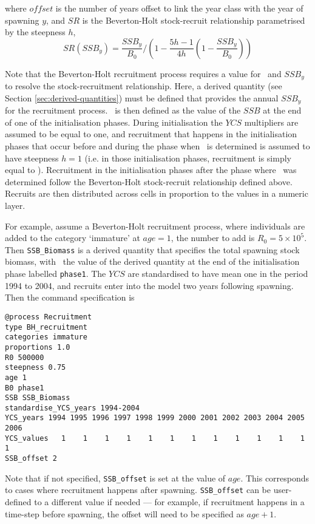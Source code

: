 where $offset$ is the number of years offset to link the year class with the year of spawning $y$, and $SR$ is the Beverton-Holt stock-recruit relationship parametrised by the steepness $h$,
\begin{equation}
SR(SSB_y) = \frac{SSB_y}{B_0} / \left( 1-\frac{5h-1}{4h} \left( 1-\frac{SSB_y}{B_0} \right) \right)
\end{equation}

Note that the Beverton-Holt recruitment process requires a value for \Bzero\ and $SSB_y$ to resolve the stock-recruitment relationship. Here, a derived quantity (see Section \ref{sec:derived-quantities}) must be defined that provides the annual $SSB_y$ for the recruitment process. \Bzero\ is then defined as the value of the $SSB$ at the end of one of the initialisation phases. During initialisation the $YCS$ multipliers are assumed to be equal to one, and recruitment that happens in the initialisation phases that occur before and during the phase when \Bzero\ is determined is assumed to have steepness $h=1$ (i.e. in those initialisation phases, recruitment is simply equal to \Rzero). Recruitment in the initialisation phases after the phase where \Bzero\ was determined follow the Beverton-Holt stock-recruit relationship defined above. Recruits are then distributed across cells in proportion to the values in a numeric layer. 

For example, assume a Beverton-Holt recruitment process, where individuals are added to the category `immature' at $age=1$, the number to add is $R_0=5 \times 10^5$. Then \texttt{SSB\_Biomass} is a derived quantity that specifies the total spawning stock biomass, with \Bzero\ the value of the derived quantity at the end of the initialisation phase labelled \texttt{phase1}. The $YCS$ are standardised to have mean one in the period 1994 to 2004, and recruits enter into the model two years following spawning. Then the command specification is

{\small{\begin{verbatim}
@process Recruitment
type BH_recruitment
categories immature
proportions 1.0
R0 500000
steepness 0.75
age 1
B0 phase1
SSB SSB_Biomass
standardise_YCS_years 1994-2004
YCS_years 1994 1995 1996 1997 1998 1999 2000 2001 2002 2003 2004 2005 2006
YCS_values   1    1    1    1    1    1    1    1    1    1    1    1    1
SSB_offset 2
\end{verbatim}}}

Note that if not specified, \texttt{SSB\_offset} is set at the value of $age$. This corresponds to cases where recruitment happens after spawning. \texttt{SSB\_offset} can be user-defined to a different value if needed --- for example, if recruitment happens in a time-step before spawning, the offset will need to be specified as $age + 1$.



